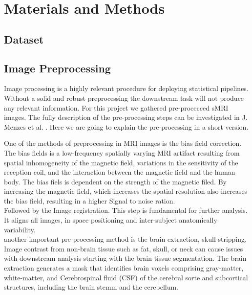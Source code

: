 \chapter{Materials and Methods}
\label{chap:methods}

\section{Dataset}
\label{sec:dataset}


\section{}


\section{Image Preprocessing}
\label{sec:preprocessing}
Image processing is a highly relevant procedure for deploying statistical pipelines. Without a solid and robust preprocessing the downstream task will not produce any relevant information. For this project we gathered pre-procecced sMRI images.
The fully description of the pre-processing steps can be investigated in J. Menzes et al. \cite{MENEZES2026111143}. Here we are going to explain the pre-processing in a short version.
 
One of the methods of preprocessing in MRI images is the bias field correction. The bias fields is a 
low-frequency spatially varying MRI artifact resulting from spatial inhomogeneity of the magnetic field, variations in the sensitivity of the reception coil, and the interaction between the magnetic field and the human body.
The bias fiels is dependent on the strength of the magnetic filed. By increasing the magnetic field, which increases the spatial resolution also increases the bias field, resulting in a higher Signal to noise ration. 
\\
Followed by the Image registration. This step is fundamental for further analysis. It aligns all images, in space positioning and inter-subject anatomically variability.   
\\
another important pre-processing method is the brain extraction, skull-stripping. Image contrast from non-brain tissue such as fat, skull, or neck can cause issues with downstream
analysis starting with the brain tissue segmentation. 
The brain extraction generates a mask that identifies brain voxels comprising gray-matter, white-matter, and Cerebrospinal fluid (CSF) of the cerebral sorte and subcortical structures, 
including the brain stemm and the cerebellum.


